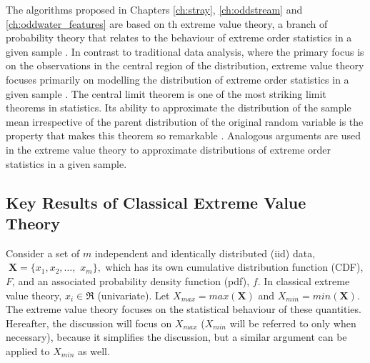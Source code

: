 \documentclass{monashthesis}
\theoremstyle{definition}
\theoremstyle{definition}
\theoremstyle{definition}
\theoremstyle{remark}
\begin{document}
The algorithms proposed in Chapters \ref{ch:stray}, \ref{ch:oddstream} and \ref{ch:oddwater_features} are based on th extreme value theory, a branch of probability theory that relates to the behaviour of extreme order statistics in a given sample \autocite{galambos2013extreme}. In contrast to traditional data analysis, where the primary focus is on the observations in the central region of the distribution, extreme value theory focuses primarily on modelling the distribution of extreme order statistics in a given sample \autocite{pinto2016advanced,clifton2009novelty}. The central limit theorem is one of the most striking limit theorems in statistics. Its ability to approximate the distribution of the sample mean irrespective of the parent distribution of the original random variable is the property that makes this theorem so remarkable \autocite{coles2001introduction}. Analogous arguments are used in the extreme value theory to approximate distributions of extreme order statistics in a given sample.

\hypertarget{key-results-of-classical-extreme-value-theory}{%
\subsection{Key Results of Classical Extreme Value Theory}\label{key-results-of-classical-extreme-value-theory}}

Consider a set of \(m\) independent and identically distributed (iid) data, \(\;\textbf{X}= \{x_{1}, x_{2}, \dots,\) \(x_{m}\},\) which has its own cumulative distribution function (CDF), \(F\), and an associated probability density function (pdf), \(f\). In classical extreme value theory, \(x_{i} \in \Re\) (univariate). Let \(X_{max}= max(\textbf{X})\) and \(X_{min}= min(\textbf{X})\). The extreme value theory focuses on the statistical behaviour of these quantities. Hereafter, the discussion will focus on \(X_{max}\) (\(X_{min}\) will be referred to only when necessary), because it simplifies the discussion, but a similar argument can be applied to \(X_{min}\) as well.
\end{document}
